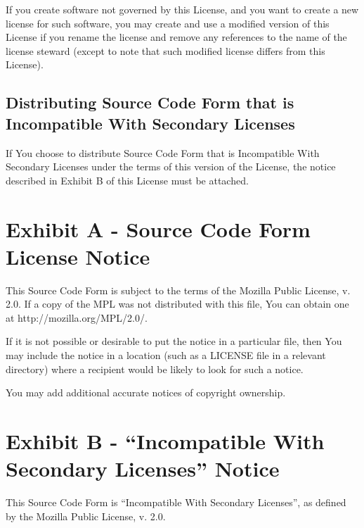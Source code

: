 \documentclass[a4paper, 12pt]{article}
\begin{document}
If you create software not governed by this License, and you want to create a new license for such software, you may create and use a modified version of this License if you rename the license and remove any references to the name of the license steward (except to note that such modified license differs from this License).

\subsection{Distributing Source Code Form that is Incompatible With Secondary
Licenses}

If You choose to distribute Source Code Form that is Incompatible With Secondary Licenses under the terms of this version of the License, the notice described in Exhibit B of this License must be attached.

\appendix

\section*{Exhibit A - Source Code Form License Notice}

This Source Code Form is subject to the terms of the Mozilla Public License, v. 2.0. If a copy of the MPL was not distributed with this file, You can obtain one at http://mozilla.org/MPL/2.0/.

If it is not possible or desirable to put the notice in a particular file, then You may include the notice in a location (such as a LICENSE file in a relevant directory) where a recipient would be likely to look for such a notice.

You may add additional accurate notices of copyright ownership.

\section*{Exhibit B - ``Incompatible With Secondary Licenses'' Notice}

This Source Code Form is ``Incompatible With Secondary Licenses'', as defined by the Mozilla Public License, v. 2.0.
\end{document}

